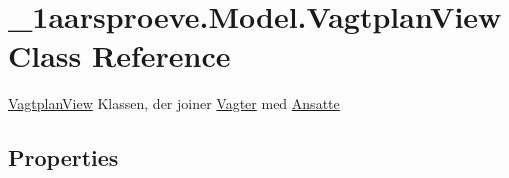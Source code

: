 \hypertarget{class__1aarsproeve_1_1_model_1_1_vagtplan_view}{}\section{\+\_\+1aarsproeve.\+Model.\+Vagtplan\+View Class Reference}
\label{class__1aarsproeve_1_1_model_1_1_vagtplan_view}


\hyperlink{class__1aarsproeve_1_1_model_1_1_vagtplan_view}{Vagtplan\+View} Klassen, der joiner \hyperlink{class__1aarsproeve_1_1_model_1_1_vagter}{Vagter} med \hyperlink{class__1aarsproeve_1_1_model_1_1_ansatte}{Ansatte}  


\subsection*{Properties}
